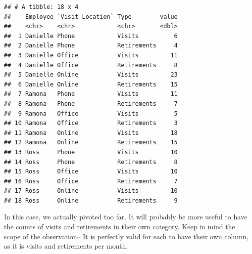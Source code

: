 \documentclass[
]{book}
\newenvironment{Shaded}{\begin{snugshade}}{\end{snugshade}}
\newcommand{\DataTypeTok}[1]{\textcolor[rgb]{0.13,0.29,0.53}{#1}}
\newcommand{\KeywordTok}[1]{\textcolor[rgb]{0.13,0.29,0.53}{\textbf{#1}}}
\newcommand{\NormalTok}[1]{#1}
\newcommand{\OperatorTok}[1]{\textcolor[rgb]{0.81,0.36,0.00}{\textbf{#1}}}
\newcommand{\StringTok}[1]{\textcolor[rgb]{0.31,0.60,0.02}{#1}}
\begin{document}
\begin{Shaded}
\end{Shaded}

\begin{verbatim}
## # A tibble: 18 x 4
##    Employee `Visit Location` Type        value
##    <chr>    <chr>            <chr>       <dbl>
##  1 Danielle Phone            Visits          6
##  2 Danielle Phone            Retirements     4
##  3 Danielle Office           Visits         11
##  4 Danielle Office           Retirements     8
##  5 Danielle Online           Visits         23
##  6 Danielle Online           Retirements    15
##  7 Ramona   Phone            Visits         11
##  8 Ramona   Phone            Retirements     7
##  9 Ramona   Office           Visits          5
## 10 Ramona   Office           Retirements     3
## 11 Ramona   Online           Visits         18
## 12 Ramona   Online           Retirements    15
## 13 Ross     Phone            Visits         10
## 14 Ross     Phone            Retirements     8
## 15 Ross     Office           Visits         10
## 16 Ross     Office           Retirements     7
## 17 Ross     Online           Visits         10
## 18 Ross     Online           Retirements     9
\end{verbatim}

In this case, we actually pivoted too far. It will probably be more useful to have the counts of visits and retirements in their own category. Keep in mind the scope of the observation-- It is perfectly valid for each to have their own column, as it is visits and retirements per month.

\begin{Shaded}
\end{Shaded}
\end{document}
